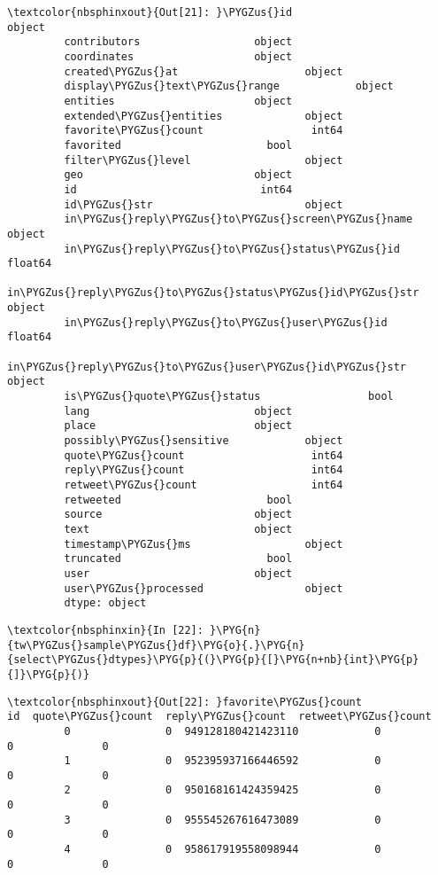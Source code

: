 \documentclass[letterpaper,10pt,english]{sphinxmanual}
\begin{document}
%
\begin{Verbatim}[commandchars=\\\{\}]
\textcolor{nbsphinxout}{Out[21]: }\PYGZus{}id                           object
         contributors                  object
         coordinates                   object
         created\PYGZus{}at                    object
         display\PYGZus{}text\PYGZus{}range            object
         entities                      object
         extended\PYGZus{}entities             object
         favorite\PYGZus{}count                 int64
         favorited                       bool
         filter\PYGZus{}level                  object
         geo                           object
         id                             int64
         id\PYGZus{}str                        object
         in\PYGZus{}reply\PYGZus{}to\PYGZus{}screen\PYGZus{}name       object
         in\PYGZus{}reply\PYGZus{}to\PYGZus{}status\PYGZus{}id        float64
         in\PYGZus{}reply\PYGZus{}to\PYGZus{}status\PYGZus{}id\PYGZus{}str     object
         in\PYGZus{}reply\PYGZus{}to\PYGZus{}user\PYGZus{}id          float64
         in\PYGZus{}reply\PYGZus{}to\PYGZus{}user\PYGZus{}id\PYGZus{}str       object
         is\PYGZus{}quote\PYGZus{}status                 bool
         lang                          object
         place                         object
         possibly\PYGZus{}sensitive            object
         quote\PYGZus{}count                    int64
         reply\PYGZus{}count                    int64
         retweet\PYGZus{}count                  int64
         retweeted                       bool
         source                        object
         text                          object
         timestamp\PYGZus{}ms                  object
         truncated                       bool
         user                          object
         user\PYGZus{}processed                object
         dtype: object
\end{Verbatim}

%
\begin{Verbatim}[commandchars=\\\{\}]
\textcolor{nbsphinxin}{In [22]: }\PYG{n}{tw\PYGZus{}sample\PYGZus{}df}\PYG{o}{.}\PYG{n}{select\PYGZus{}dtypes}\PYG{p}{(}\PYG{p}{[}\PYG{n+nb}{int}\PYG{p}{]}\PYG{p}{)}
\end{Verbatim}

%
\begin{Verbatim}[commandchars=\\\{\}]
\textcolor{nbsphinxout}{Out[22]: }favorite\PYGZus{}count                  id  quote\PYGZus{}count  reply\PYGZus{}count  retweet\PYGZus{}count
         0               0  949128180421423110            0            0              0
         1               0  952395937166446592            0            0              0
         2               0  950168161424359425            0            0              0
         3               0  955545267616473089            0            0              0
         4               0  958617919558098944            0            0              0
\end{Verbatim}
\end{document}
